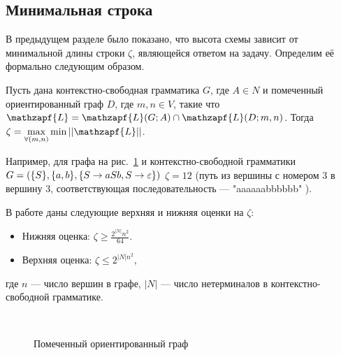 \documentclass{spbau-diploma}
\begin{document}
\subsection{Минимальная строка}
В предыдущем разделе было показано, что высота схемы зависит от минимальной длины строки $\zeta$, являющейся ответом на задачу. Определим её формально  следующим образом.
\par
Пусть дана контекстно-свободная грамматика $G$, где $A \in N$  и помеченный ориентированный граф $D$, где $m, n \in V$, такие что  $\mathzapf{L} = \mathzapf{L}(G; A) \cap  \mathzapf{L}(D; m, n)$. Тогда $\zeta = \max\limits_{\forall(m,n)}\min ||\mathzapf{L}||$.
\par
Например, для графа на рис.~\ref{graph} и контекстно-свободной грамматики $G = (\{S\}, \{a, b\},\\ \{S \rightarrow aSb, 
S \rightarrow \varepsilon\})$ $\zeta = 12$ (путь из вершины с номером 3 в вершину 3, соответствующая последовательность  --- "aaaaaabbbbbb" ).
\par
В работе \cite{HellingsCFPQ} даны следующие верхняя и нижняя оценки на $\zeta$:
\begin{itemize}
\item Нижняя оценка:  $\zeta \ge \frac{2^{|N|}n^2}{64} $.
\item Верхняя оценка: $\zeta \le 2^{|N|n^2}$,
\end{itemize}
где $n$ --- число вершин в графе, $|N|$ --- число нетерминалов в контекстно-свободной грамматике. 
\begin{figure}
\centering

\\
	\caption{Помеченный ориентированный граф}
\label{graph}
\end{figure}
\end{document}

